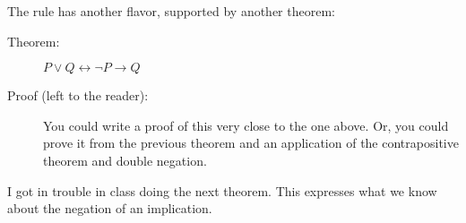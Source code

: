 \documentclass[12pt]{article}
\begin{document}
The rule has another flavor, supported by another theorem:

\begin{description}

\item[Theorem:]  $P \vee Q \leftrightarrow \neg P \rightarrow Q$

\item[Proof (left to the reader):]  You could write a proof of this very close to the one above.  Or, you could prove it from the previous theorem and an application of the contrapositive theorem and double negation.

\end{description}

\newpage

I got in trouble in class doing the next theorem.  This expresses what we know about the negation of an implication.
\end{document}
